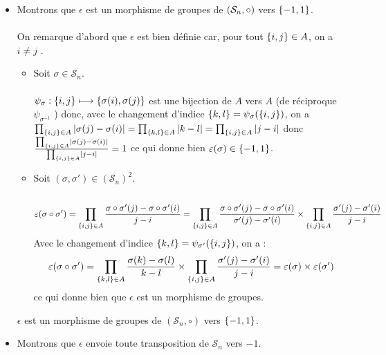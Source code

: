 \begin{dem}
    \begin{itemize}
    \item Montrons que \(\epsilon\)  est un morphisme de groupes de \(\left(\mathcal{S}_n, \circ\right)\) vers \(\left\lbrace-1, 1\right\rbrace\).\\~\\
        On remarque d’abord que \(\epsilon\)  est bien définie car, pour tout \(\left\lbrace i, j\right\rbrace \in A\), on a \(i\neq j\) .
        \begin{itemize}
            \item  Soit \(\sigma \in  \mathcal{S}_n\).\\~\\
                \(\psi_{\sigma}  : \left\lbrace i, j\right\rbrace \longmapsto \left\lbrace\sigma (i), \sigma (j)\right\rbrace\) est une bijection de \(A\) vers \(A\) (de réciproque \(\psi_{\sigma^{-1}}\) ) donc, avec le changement d’indice \(\left\lbrace k, l\right\rbrace = \psi_{\sigma} (\left\lbrace i, j\right\rbrace)\), on a \(\prod_{\left\lbrace i,j\right\rbrace\in A} \left\lvert\sigma (j) - \sigma (i)\right\rvert = \prod_{\left\lbrace k,l\right\rbrace\in A}\left\lvert k - l\right\rvert = \prod_{\left\lbrace i,j\right\rbrace\in A} \left\lvert j - i\right\rvert \) donc \(\frac{\prod_{\left\lbrace i,j\right\rbrace\in A} \left\lvert\sigma (j) - \sigma (i)\right\rvert}{\prod_{\left\lbrace i,j\right\rbrace\in A} \left\lvert j - i\right\rvert} = 1\)  ce qui donne bien \(\varepsilon (\sigma ) \in  \left\lbrace-1, 1\right\rbrace\).
            \item Soit \((\sigma , \sigma ') \in  (\mathcal{S}_n)^2\).\\~\\
                \[\varepsilon  (\sigma  \circ \sigma ') = \prod_{\left\lbrace i,j\right\rbrace\in A} \frac{\sigma  \circ \sigma '(j) - \sigma  \circ \sigma '(i)}{j - i} = \prod_{\left\lbrace i,j\right\rbrace\in A} \frac{\sigma  \circ \sigma '(j) - \sigma  \circ \sigma '(i)}{\sigma '(j) - \sigma '(i)} \times \prod_{\left\lbrace i,j\right\rbrace\in A} \frac{\sigma '(j) - \sigma '(i)}{j - i}\]
                Avec le changement d’indice \(\left\lbrace k, l\right\rbrace = \psi_{\sigma '} (\left\lbrace i, j\right\rbrace)\), on a :
                \[ \varepsilon  (\sigma  \circ \sigma ') = \prod_{\left\lbrace k,l\right\rbrace\in A} \frac{\sigma (k) - \sigma (l)}{k - l} \times \prod_{\left\lbrace i,j\right\rbrace\in A} \frac{\sigma '(j) - \sigma '(i)}{j - i} = \varepsilon (\sigma ) \times \varepsilon  (\sigma ')\]
                ce qui donne bien que \(\epsilon\)  est un morphisme de groupes.
        \end{itemize}
        \conclusion \(\epsilon\)  est un morphisme de groupes de \((\mathcal{S}_n, \circ)\) vers \(\left\lbrace-1, 1\right\rbrace\).
    \item Montrons que \(\epsilon\)  envoie toute transposition de \(\mathcal{S}_n\) vers \(-1\).\\~\\

\end{itemize}
\end{dem}
